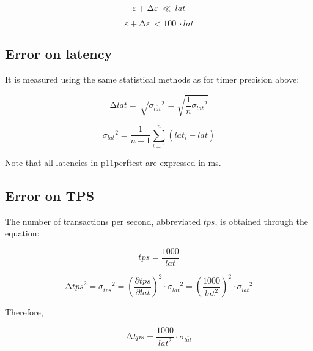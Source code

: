 \documentclass[12pt]{article}
\begin{document}
\[\varepsilon + \mathrm{\Delta}\varepsilon\  \ll \ lat\]

\[\varepsilon + \mathrm{\Delta}\varepsilon\  < 100\ \cdot lat\]

\hypertarget{error-on-latency}{
\subsection{Error on latency}\label{error-on-latency}}

It is measured using the same statistical methods as for timer precision
above:

\[\mathrm{\Delta}lat = \ \sqrt{{\sigma_{\overline{lat}}}^{2}} = \sqrt{\frac{1}{n}{\sigma_{lat}}^{2}}\]

\[{\sigma_{lat}}^{2} = \frac{1}{n - 1}\sum_{i = 1}^{n}\left( {lat}_{i} - \overline{lat} \right)\]

Note that all latencies in p11perftest are expressed in ms.

\hypertarget{error-on-tps}{%
\subsection{Error on TPS}\label{error-on-tps}}

The number of transactions per second, abbreviated \(tps\), is obtained through the equation:

\[tps = \frac{1000}{lat}\]

\[{\mathrm{\Delta}tps}^{2} = {\sigma_{\overline{tps}}}^{2} = \left( \frac{\partial tps}{\partial lat} \right)^{2} \cdot {\sigma_{\overline{lat}}}^{2} = \left( \frac{1000}{{lat}^{2}} \right)^{2} \cdot {\sigma_{\overline{lat}}}^{2}\]

Therefore,

\[\mathrm{\Delta}tps = \frac{1000}{{lat}^{2}} \cdot \sigma_{\overline{lat}}\]
\end{document}
